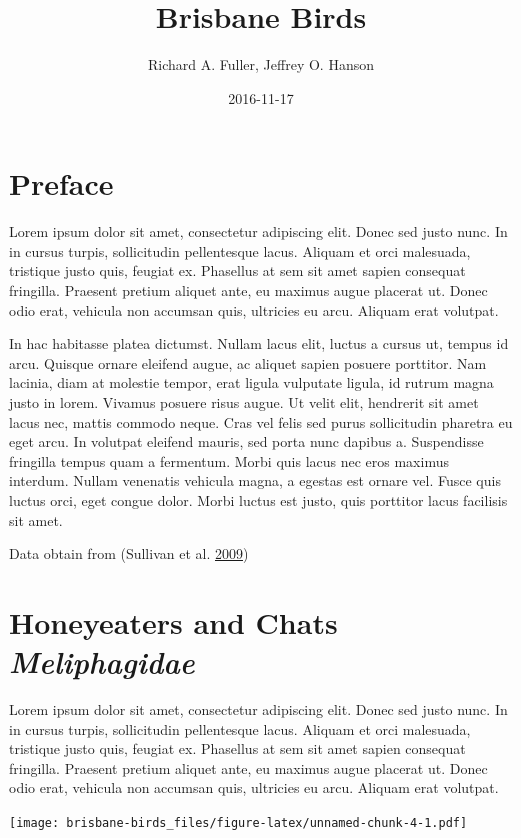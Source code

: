 \documentclass[]{book}
\title{Brisbane Birds}
\author{Richard A. Fuller, Jeffrey O. Hanson}
\date{2016-11-17}
\begin{document}
\maketitle

{
\setcounter{tocdepth}{1}
\tableofcontents
}
\chapter{Preface}\label{preface}

Lorem ipsum dolor sit amet, consectetur adipiscing elit. Donec sed justo
nunc. In in cursus turpis, sollicitudin pellentesque lacus. Aliquam et
orci malesuada, tristique justo quis, feugiat ex. Phasellus at sem sit
amet sapien consequat fringilla. Praesent pretium aliquet ante, eu
maximus augue placerat ut. Donec odio erat, vehicula non accumsan quis,
ultricies eu arcu. Aliquam erat volutpat.

In hac habitasse platea dictumst. Nullam lacus elit, luctus a cursus ut,
tempus id arcu. Quisque ornare eleifend augue, ac aliquet sapien posuere
porttitor. Nam lacinia, diam at molestie tempor, erat ligula vulputate
ligula, id rutrum magna justo in lorem. Vivamus posuere risus augue. Ut
velit elit, hendrerit sit amet lacus nec, mattis commodo neque. Cras vel
felis sed purus sollicitudin pharetra eu eget arcu. In volutpat eleifend
mauris, sed porta nunc dapibus a. Suspendisse fringilla tempus quam a
fermentum. Morbi quis lacus nec eros maximus interdum. Nullam venenatis
vehicula magna, a egestas est ornare vel. Fusce quis luctus orci, eget
congue dolor. Morbi luctus est justo, quis porttitor lacus facilisis sit
amet.

Data obtain from (Sullivan et al. \protect\hyperlink{ref-r1}{2009})

\chapter{\texorpdfstring{Honeyeaters and Chats
\emph{Meliphagidae}}{Honeyeaters and Chats Meliphagidae}}\label{honeyeaters-and-chats-meliphagidae}

Lorem ipsum dolor sit amet, consectetur adipiscing elit. Donec sed justo
nunc. In in cursus turpis, sollicitudin pellentesque lacus. Aliquam et
orci malesuada, tristique justo quis, feugiat ex. Phasellus at sem sit
amet sapien consequat fringilla. Praesent pretium aliquet ante, eu
maximus augue placerat ut. Donec odio erat, vehicula non accumsan quis,
ultricies eu arcu. Aliquam erat volutpat.

\texttt{[image: brisbane-birds\_files/figure-latex/unnamed-chunk-4-1.pdf]}
\end{document}
